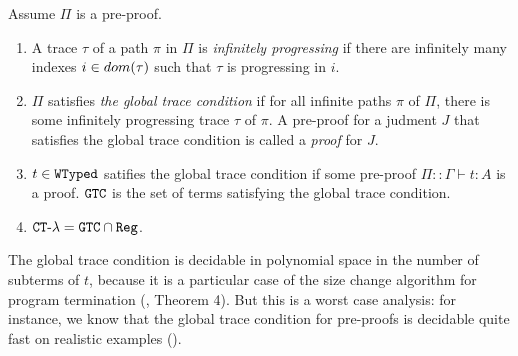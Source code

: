 \begin{definition}\label{definition-global-trace-condition}
Assume $\Pi$ is a pre-proof.
\begin{enumerate}
\item
A trace $\tau$ of a path $\pi$ in $\Pi$ is \emph{infinitely progressing} 
if there are infinitely many indexes $i \in {{\relax dom}}(\tau)$ such that $\tau$ is progressing in $i$.

\item
$\Pi$ satisfies \emph{the global trace condition} if 
for all infinite paths $\pi$ of $\Pi$,
there is some infinitely progressing trace $\tau$ of $\pi$.
A pre-proof for a judment $J$ that satisfies the global trace condition is called a \emph{proof} for $J$.

\item
$t \in {\tt WTyped}$ satifies the global trace condition if
some pre-proof $\Pi::\Gamma \vdash t :A$ is a proof.
${\tt GTC}$ is the set of terms satisfying the global trace condition.

\item
  ${ {\tt CT}\mbox{-}\lambda} = {\tt GTC} \cap {\tt Reg}$. 
\end{enumerate}
\end{definition}

The global trace condition is decidable in polynomial space in the number of
subterms of $t$, %
because it is a particular case of the size change algorithm for program 
termination (\cite{SCT}, Theorem 4). 
But this is a worst case analysis: for instance, 
we know that the global trace condition for pre-proofs is decidable quite fast on realistic examples
(\cite{10.1007/978-3-642-35182-2_25, 10.1145/3018610.3018623, 10.1145/3632888, 10.1007/978-3-031-90643-5_18, 10.1145/3453483.3454087, Brotherston2020, Stratulat_2021}). 

